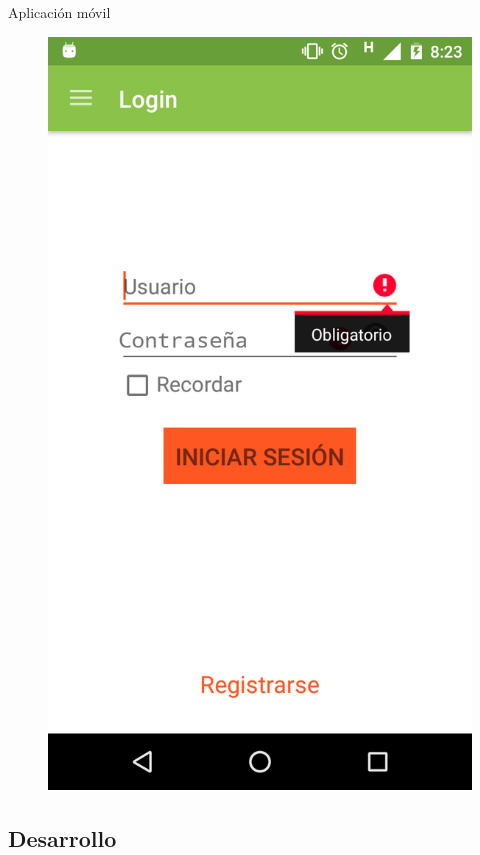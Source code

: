 \documentclass[10pt,xcolor=svgnames]{beamer}
\begin{document}
\begin{frame}{Aplicación móvil}
\begin{minipage}{\linewidth}
    \begin{minipage}{0.4\linewidth}
      \begin{figure}[H]
        \includegraphics[width=\linewidth]{img/captura_13}
      \end{figure}
    \end{minipage}
  \end{minipage}
\end{frame}


\subsection{Desarrollo}
\end{document}
